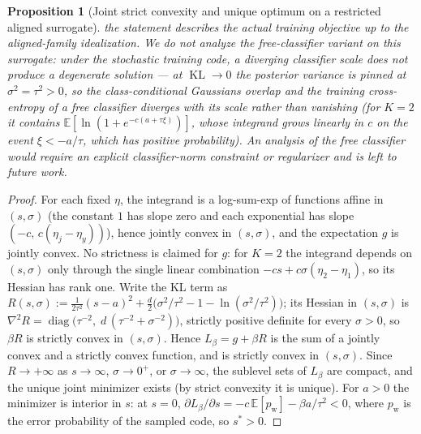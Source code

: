 \documentclass{article}
\theoremstyle{plain}
\newtheorem{proposition}{Proposition}[section]
\theoremstyle{remark}
\newcommand{\E}{\mathbb{E}}
\begin{document}
\begin{proposition}[Joint strict convexity and unique optimum on a restricted aligned surrogate]
the statement describes the actual training objective up to the aligned-family
idealization. We do not analyze the free-classifier variant on this surrogate: under
the stochastic training code, a diverging classifier scale does not produce a
degenerate solution --- at $\operatorname{KL} \to 0$ the posterior variance is pinned
at $\sigma^2 = \tau^2 > 0$, so the class-conditional Gaussians overlap and the
training cross-entropy of a free classifier diverges with its scale rather than
vanishing (for $K = 2$ it contains $\E[\ln(1 + e^{-c(a + \tau\xi)})]$, whose
integrand grows linearly in $c$ on the event $\xi < -a/\tau$, which has positive
probability). An analysis of the free classifier would require an explicit
classifier-norm constraint or regularizer and is left to future work.
\end{proposition}

\begin{proof}
For each fixed $\eta$, the integrand is a log-sum-exp of functions affine in
$(s, \sigma)$ (the constant $1$ has slope zero and each exponential has slope
$(-c,\, c(\eta_j - \eta_y))$), hence jointly convex in $(s, \sigma)$, and the
expectation $g$ is jointly convex. No strictness is claimed for $g$: for $K = 2$ the
integrand depends on $(s, \sigma)$ only through the single linear combination
$-cs + c\sigma(\eta_2 - \eta_1)$, so its Hessian has rank one. Write the KL term as
$R(s, \sigma) := \tfrac{1}{2\tau^2}(s-a)^2
+ \tfrac{d}{2}\bigl(\sigma^2/\tau^2 - 1 - \ln(\sigma^2/\tau^2)\bigr)$; its Hessian in
$(s, \sigma)$ is
$\nabla^2 R = \operatorname{diag}\bigl(\tau^{-2},\; d\,(\tau^{-2} + \sigma^{-2})\bigr)$,
strictly positive definite for every $\sigma > 0$, so $\beta R$ is strictly convex in
$(s, \sigma)$. Hence $L_\beta = g + \beta R$ is the sum of a jointly convex and a
strictly convex function, and is strictly convex in $(s, \sigma)$. Since
$R \to +\infty$ as $s \to \infty$, $\sigma \to 0^+$, or $\sigma \to \infty$, the
sublevel sets of $L_\beta$ are compact, and the unique joint minimizer exists (by
strict convexity it is unique). For $a > 0$ the minimizer is interior in $s$: at
$s = 0$, $\partial L_\beta/\partial s = -c\,\E[p_{\mathrm{w}}] - \beta a/\tau^2 < 0$,
where $p_{\mathrm{w}}$ is the error probability of the sampled code, so $s^* > 0$.
\end{proof}
\end{document}
